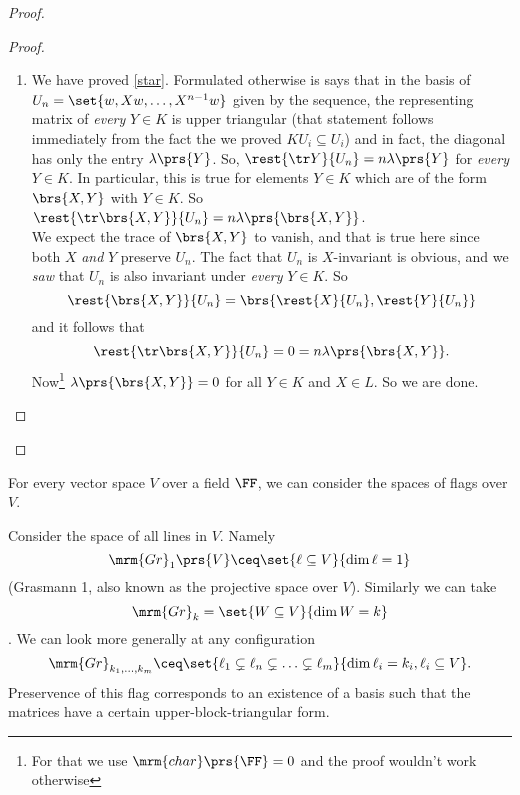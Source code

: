 \documentclass[10pt,a4paper,twoside,openany,hidelinks]{book}
\begin{document}
\begin{proof}
\begin{description}
\begin{proof}
\begin{enumerate}[label = \Roman*)]
\begin{proof}
\begin{enumerate}[label = (\roman*)]
\begin{itemize}
But by definition, $X U_{i-1} \subseteq U_i$. Hence
\[XYX^{i-1} = \lambda\prs{Y}X^i + w''\]
where $w'' \in U_i$.
\item The second summand \[\brs{X,Y}X^{i-1}w = \lambda\prs{\brs{X,Y}}X^{i-1}w + w'''\] where $w''' \in U_{i-1}$ by the induction hypothesis.
This means \[\brs{X,Y} X^{i-1}w \in U_i + U_{i-1} \subseteq U_i\text{.}\]
\end{itemize}
The net conclusion is that
\begin{align*}
YX^i w = \lambda\prs{Y}X^i w + w''''
\end{align*}
with $w'''' \in U_i$.
So $YX^iw \equiv \lambda\prs{Y}X^i w \mod{U_i}$ for all $1 \leq i \leq n$.
\end{enumerate}
\end{proof}
\item We have proved \eqref{star}. Formulated otherwise is says that in the basis of $U_n = \set{w, Xw, \ldots, X^{n-1}w}$ given by the sequence, the representing matrix of \emph{every} $Y \in K$ is upper triangular (that statement follows immediately from the fact the we proved $KU_i \subseteq U_i$) and in fact, the diagonal has only the entry $\lambda\prs{Y}$.
So, $\rest{\tr Y}{U_n} = n\lambda\prs{Y}$ for \emph{every} $Y \in K$.
In particular, this is true for elements $Y \in K$ which are of the form $\brs{X,Y}$ with $Y \in K$.
So $\rest{\tr \brs{X,Y}}{U_n} = n\lambda\prs{\brs{X,Y}}$. \\
We expect the trace of $\brs{X,Y}$ to vanish, and that is true here since both $X$ \emph{and} $Y$ preserve $U_n$. The fact that $U_n$ is $X$-invariant is obvious, and we \emph{saw} that $U_n$ is also invariant under \emph{every} $Y \in K$.
So
\[\rest{\brs{X,Y}}{U_n} = \brs{\rest{X}{U_n}, \rest{Y}{U_n}}\]
and it follows that
\[\rest{\tr\brs{X,Y}}{U_n} = 0 = n\lambda\prs{\brs{X,Y}}\text{.}\]
Now\footnote{For that we use $\mrm{char}\prs{\FF} = 0$ and the proof wouldn't work otherwise} $\lambda\prs{\brs{X,Y}} = 0$ for all $Y \in K$ and $X \in L$. So we are done.
\end{enumerate}
\end{proof}
\end{description}
\end{proof}
\begin{remark}
For every vector space $V$ over a field $\FF$,%
%
we can consider the spaces of flags over $V$.
\end{remark}
\begin{example}
Consider the space of all lines in $V$. Namely \[\mrm{Gr}_1\prs{V} \ceq \set{\ell \subseteq V}{\dim \ell = 1}\] (Grasmann 1, also known as the projective space over $V$).
Similarly we can take
\[\mrm{Gr}_k = \set{W \subseteq V}{\dim W = k}\] .
We can look more generally at any configuration
\[\mrm{Gr}_{k_1, \ldots, k_m} \ceq \set{\ell_1 \subsetneq \ell_n \subsetneq \ldots \subsetneq \ell_m}{\dim \ell_i = k_i , \ell_i \subseteq V}\text{.}\]
Preservence of this flag corresponds to an existence of a basis such that the matrices have a certain upper-block-triangular form.
\end{example}
\end{document}
